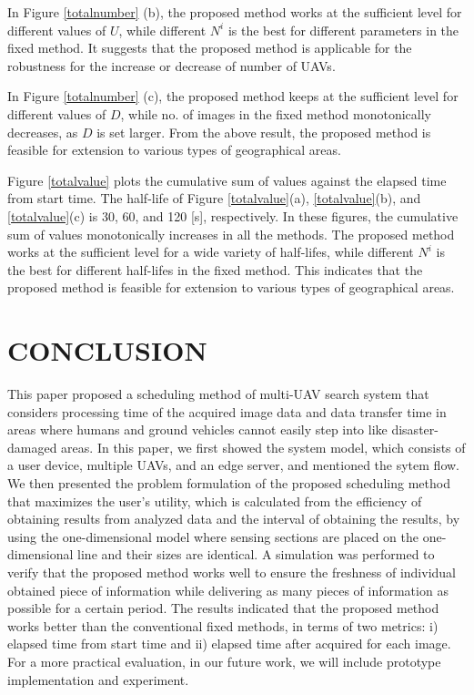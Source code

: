 \documentclass{ieeeaccess}
\begin{document}
In Figure \ref{totalnumber} (b), the proposed method works at the sufficient level for different values of $U$, while different $N^i$ is the best for different parameters in the fixed method.
It suggests that the proposed method is applicable for the robustness for the increase or decrease of number of UAVs.

In Figure \ref{totalnumber} (c), the proposed method keeps at the sufficient level for different values of $D$, while no. of images in the fixed method monotonically decreases, as $D$ is set larger.
From the above result, the proposed method is feasible for extension to various types of geographical areas.

Figure \ref{totalvalue} plots the cumulative sum of values against the elapsed time from start time.
The half-life of Figure \ref{totalvalue}(a), \ref{totalvalue}(b), and \ref{totalvalue}(c) is 30, 60, and 120 [s], respectively.
In these figures, the cumulative sum of values monotonically increases in all the methods.
The proposed method works at the sufficient level for a wide variety of half-lifes, while different $N^i$ is the best for different half-lifes in the fixed method.
This indicates that the proposed method is feasible for extension to various types of geographical areas.

\section{CONCLUSION}
This paper proposed a scheduling method of multi-UAV search system that considers processing time of the acquired image data and data transfer time in areas where humans and ground vehicles cannot easily step into like disaster-damaged areas.
In this paper, we first showed the system model, which consists of a user device, multiple UAVs, and an edge server, and mentioned the sytem flow. 
We then presented the problem formulation of the proposed scheduling method that maximizes the user's utility, which is calculated from the efficiency of obtaining results from analyzed data and the interval of obtaining the results, by using the one-dimensional model where sensing sections are placed on the one-dimensional line and their sizes are identical.
A simulation was performed to verify that the proposed method works well to ensure the freshness of individual obtained piece of information while delivering as many pieces of information as possible for a certain period.
The results indicated that the proposed method works better than the conventional fixed methods, in terms of two metrics: i) elapsed time from start time and ii) elapsed time after acquired for each image.
For a more practical evaluation, in our future work, we will include prototype implementation and experiment.
\end{document}
